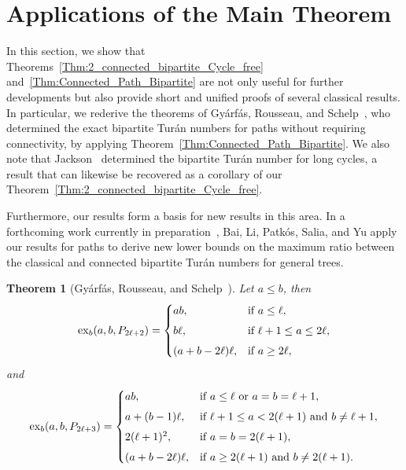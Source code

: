 \documentclass[11pt,a4paper]{article}
\newtheorem{theorem}{Theorem}%
\newcommand{\ex}{{\rm ex}}
\begin{document}
\section{Applications of the Main Theorem}\label{sec:Applications}
In this section, we show that Theorems~\ref{Thm:2_connected_bipartite_Cycle_free} and~\ref{Thm:Connected_Path_Bipartite} are not only useful for further developments but also provide short and unified proofs of several classical results.
In particular, we rederive the theorems of Gyárfás, Rousseau, and Schelp~\cite{gyarfas1984extremal}, who determined the exact bipartite Turán numbers for paths without requiring connectivity, by applying Theorem~\ref{Thm:Connected_Path_Bipartite}.
We also note that Jackson~\cite{jackson1985long} determined the bipartite Turán number for long cycles, a result that can likewise be recovered as a corollary of our Theorem~\ref{Thm:2_connected_bipartite_Cycle_free}.

Furthermore, our results form a basis for new results in this area.
In a forthcoming work currently in preparation~\cite{bai2025}, Bai, Li, Patkós, Salia, and Yu apply our results for paths to derive new lower bounds on the maximum ratio between the classical and connected bipartite Turán numbers for general trees.


\begin{theorem}[Gyárfás, Rousseau, and Schelp~\cite{gyarfas1984extremal}]\label{thm:GRS}
Let $a \le b$, then
\[
  \ex_b(a,b, P_{2\ell+2}) =
  \begin{cases}
     ab, & \text{if } a \le \ell, \\[4pt]
     b\ell, & \text{if } \ell + 1 \le a \le 2\ell, \\[4pt]
     (a + b - 2\ell)\ell, & \text{if } a \ge 2\ell,
  \end{cases}
\]
and
\[
  \ex_b(a,b, P_{2\ell+3}) =
  \begin{cases}
     ab, & \text{if } a \le \ell \text{ or } a = b = \ell + 1, \\[4pt]
     a + (b - 1)\ell, & \text{if } \ell + 1 \le a < 2(\ell + 1) \text{ and } b \neq \ell + 1, \\[4pt]
     2(\ell + 1)^2, & \text{if } a = b = 2(\ell + 1), \\[4pt]
     (a + b - 2\ell)\ell, & \text{if } a \ge 2(\ell + 1) \text{ and } b \neq 2(\ell + 1).
  \end{cases}
\]
\end{theorem}
\end{document}
